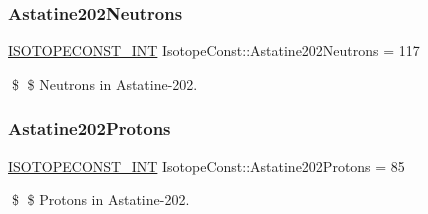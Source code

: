 \subsubsection{\texorpdfstring{Astatine202\+Neutrons}{Astatine202Neutrons}}
{\footnotesize\ttfamily \mbox{\hyperlink{group___isotope_const-_macros_ga5f18360b3e99483a35c32d789e62621c}{I\+S\+O\+T\+O\+P\+E\+C\+O\+N\+S\+T\+\_\+\+I\+NT}} Isotope\+Const\+::\+Astatine202\+Neutrons = 117}

\$ \$ Neutrons in Astatine-\/202. \mbox{\label{group___isotope_const-_astatine-_at202_ga09b3a00c5501568607826b89540da63c}} 
\subsubsection{\texorpdfstring{Astatine202\+Protons}{Astatine202Protons}}
{\footnotesize\ttfamily \mbox{\hyperlink{group___isotope_const-_macros_ga5f18360b3e99483a35c32d789e62621c}{I\+S\+O\+T\+O\+P\+E\+C\+O\+N\+S\+T\+\_\+\+I\+NT}} Isotope\+Const\+::\+Astatine202\+Protons = 85}

\$ \$ Protons in Astatine-\/202. 
